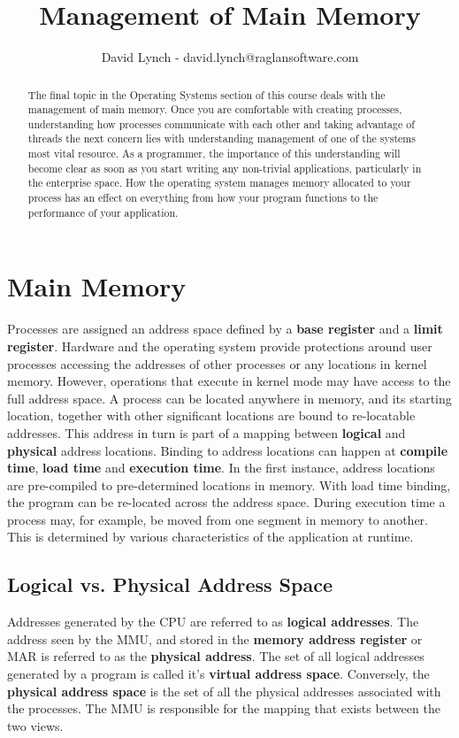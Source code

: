 \documentclass[10pt,a4paper]{article}
\title{Management of Main Memory}
\author{David Lynch - david.lynch@raglansoftware.com }
\begin{document}
\maketitle
\begin{abstract}
The final topic in the Operating Systems section of this course deals with the management of main memory. Once you are comfortable with creating processes, understanding how processes communicate with each other and taking advantage of threads the next concern lies with understanding management of one of the systems most vital resource. As a programmer, the importance of this understanding will become clear as soon as you start writing any non-trivial applications, particularly in the enterprise space. How the operating system manages memory allocated to your process has an effect on everything from how your program functions to the performance of your application. 
\end{abstract}
\section{Main Memory}
Processes are assigned an address space defined by a {\bf base register} and a {\bf limit register}. Hardware and the operating system provide protections around user processes accessing the addresses of other processes or any locations in kernel memory. However, operations that execute in kernel mode may have access to the full address space. 
\newline\newline
A process can be located anywhere in memory, and its starting location, together with other significant locations are bound to re-locatable addresses. This address in turn is part of a mapping between {\bf logical} and {\bf physical} address locations. Binding to address locations can happen at {\bf compile time}, {\bf load time} and {\bf execution time}. In the first instance, address locations are pre-compiled to pre-determined locations in memory. With load time binding, the program can be re-located across the address space. During execution time a process may, for example, be moved from one segment in memory to another. This is determined by various characteristics of the application at runtime. 
\subsection{Logical vs. Physical Address Space}
Addresses generated by the CPU are referred to as {\bf logical addresses}. The address seen by the MMU, and stored in the {\bf memory address register} or MAR is referred to as the {\bf physical address}. The set of all logical addresses generated by a program is called it's {\bf virtual address space}. Conversely, the {\bf physical address space} is the set of all the physical addresses associated with the processes. The MMU is responsible for the mapping that exists between the two views. 
\end{document}
